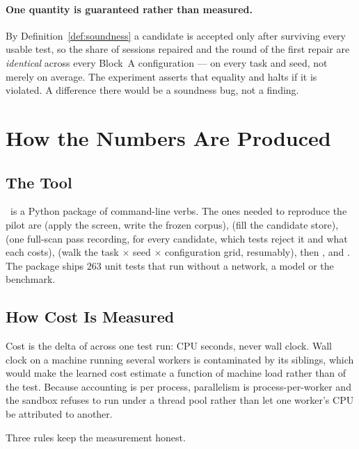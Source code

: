 \paragraph{One quantity is guaranteed rather than measured.} By
Definition~\ref{def:soundness} a candidate is accepted only after surviving
every usable test, so the share of sessions repaired and the round of the
first repair are \emph{identical} across every Block~A configuration --- on
every task and seed, not merely on average. The experiment asserts that
equality and halts if it is violated. A difference there would be a soundness
bug, not a finding.

\section{How the Numbers Are Produced}
\label{sec:exp-impl}

\subsection{The Tool}

\caster\ is a Python package of command-line verbs. The ones needed to
reproduce the pilot are  (apply the screen, write the frozen
corpus),  (fill the candidate store),  (one full-scan
pass recording, for every candidate, which tests reject it and what each
costs),  (walk the task $\times$ seed $\times$ configuration
grid, resumably), then ,  and . The
package ships $263$ unit tests that run without a network, a model or the
benchmark.

\subsection{How Cost Is Measured}

Cost is the delta of  across one test run:
CPU seconds, never wall clock. Wall clock on a machine running several workers
is contaminated by its siblings, which would make the learned cost estimate a
function of machine load rather than of the test. Because 
accounting is per process, parallelism is process-per-worker and the sandbox
refuses to run under a thread pool rather than let one worker's CPU be
attributed to another.

Three rules keep the measurement honest.


